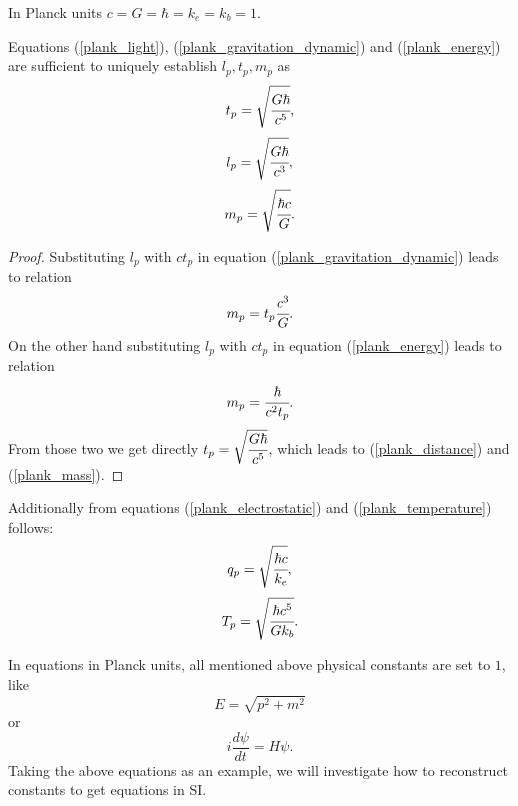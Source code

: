\documentclass[main.tex]{subfiles}
\begin{document}
\begin{corollary}
In Planck units $c = G = \hbar = k_e = k_b = 1$.
\end{corollary}
\begin{theorem}
Equations (\ref{plank_light}), (\ref{plank_gravitation_dynamic}) and (\ref{plank_energy}) are sufficient to uniquely establish $l_p, t_p, m_p$ as
\begin{equation}
    t_p = \sqrt{\cfrac{G\hbar}{c^5}},
\end{equation}
\begin{equation}
\label{plank_distance}
    l_p = \sqrt{\cfrac{G\hbar}{c^3}},
\end{equation}
\begin{equation}
\label{plank_mass}
    m_p = \sqrt{\cfrac{\hbar c}{G}}.
\end{equation}
\end{theorem}
\begin{proof}
Substituting $l_p$ with $ct_p$ in equation (\ref{plank_gravitation_dynamic}) leads to relation
\begin{equation}
    m_p = t_p \cfrac{c^3}{G}.
\end{equation}
On the other hand substituting $l_p$ with $ct_p$ in equation (\ref{plank_energy}) leads to relation
\begin{equation}
    m_p = \cfrac{\hbar}{c^2t_p}.
\end{equation}
From those two we get directly $t_p = \sqrt{\cfrac{G\hbar}{c^5}}$, which leads to (\ref{plank_distance}) and (\ref{plank_mass}).
\end{proof}
\begin{corollary}
Additionally from equations (\ref{plank_electrostatic}) and (\ref{plank_temperature}) follows:
\begin{equation}
    q_p = \sqrt{\cfrac{\hbar c}{k_e}},
\end{equation}
\begin{equation}
    T_p = \sqrt{\cfrac{\hbar c^5}{Gk_b}}.
\end{equation}
\end{corollary}
In equations in Planck units, all mentioned above physical constants are set to $1$, like
\begin{equation}
\label{relative_energy_example}
    E = \sqrt{p^2 + m^2}
\end{equation}
or 
\begin{equation}
\label{schrodinger_example}
    i\frac{d\psi}{dt} = H\psi.
\end{equation}
Taking the above equations as an example, we will investigate how to reconstruct constants to get equations in SI.
\end{document}
